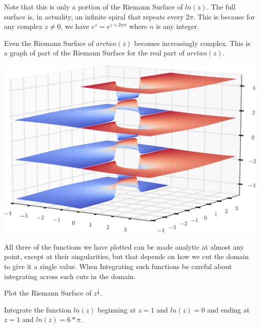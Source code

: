 Note that this is only a portion of the Riemann Surface of $ln(z)$. The full surface is, in actuality, an infinite spiral that repeats every $2\pi$. This is because for any complex $z\neq 0$, we have $e^z=e^{z+2n\pi}$ where $n$ is any integer. 

Even the Riemann Surface of $arctan(z)$ becomes increasingly complex. This is a graph of part of the Riemann Surface for the real part of $arctan(z)$.

\includegraphics[width=\textwidth]{RiemannSurface4}

All three of the functions we have plotted can be made analytic at almost any point, except at their singularities, but that depends on how we cut the domain to give it a single value. When Integrating such functions be careful about integrating across such cuts in the domain.

\begin{problem}
Plot the Riemann Surface of $z^{\frac{1}{4}}$.
\end{problem}

\begin{problem}
Integrate the function $ln(z)$ beginning at $z=1$ and $ln(z)=0$ and ending at $z=1$ and $ln(z)=6*\pi$.
\end{problem}